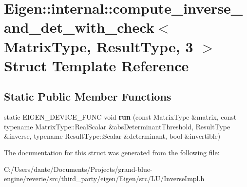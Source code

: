 \hypertarget{struct_eigen_1_1internal_1_1compute__inverse__and__det__with__check_3_01_matrix_type_00_01_result_type_00_013_01_4}{}\section{Eigen\+::internal\+::compute\+\_\+inverse\+\_\+and\+\_\+det\+\_\+with\+\_\+check$<$ Matrix\+Type, Result\+Type, 3 $>$ Struct Template Reference}
\label{struct_eigen_1_1internal_1_1compute__inverse__and__det__with__check_3_01_matrix_type_00_01_result_type_00_013_01_4}
\subsection*{Static Public Member Functions}
\begin{DoxyCompactItemize}
\item 
\mbox{\label{struct_eigen_1_1internal_1_1compute__inverse__and__det__with__check_3_01_matrix_type_00_01_result_type_00_013_01_4_af6d645a2657bca93b5fc20cae807056d}} 
static E\+I\+G\+E\+N\+\_\+\+D\+E\+V\+I\+C\+E\+\_\+\+F\+U\+NC void {\bfseries run} (const Matrix\+Type \&matrix, const typename Matrix\+Type\+::\+Real\+Scalar \&abs\+Determinant\+Threshold, Result\+Type \&inverse, typename Result\+Type\+::\+Scalar \&determinant, bool \&invertible)
\end{DoxyCompactItemize}


The documentation for this struct was generated from the following file\+:\begin{DoxyCompactItemize}
\item 
C\+:/\+Users/dante/\+Documents/\+Projects/grand-\/blue-\/engine/reverie/src/third\+\_\+party/eigen/\+Eigen/src/\+L\+U/Inverse\+Impl.\+h\end{DoxyCompactItemize}
